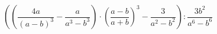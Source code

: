\begin{ex}[type=expression]
	\begin{condition}
		\( \left( \left( \dfrac{4a}{(a-b)^3} -\dfrac{a}{a^3-b^3}\right)\cdot\left( \dfrac{a-b}{a+b} \right)^3-\dfrac{3}{a^2-b^2} \right):\dfrac{3b^2}{a^6-b^6} \)
	\end{condition}
\end{ex}